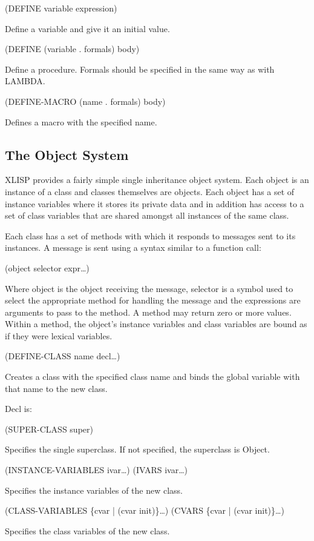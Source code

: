 \documentclass[11pt]{article}
\begin{document}
(DEFINE variable expression)

Define a variable and give it an initial value.

(DEFINE (variable . formals) body)

Define a procedure.  Formals should be specified in the same way as with
LAMBDA.

(DEFINE-MACRO (name . formals) body)

Defines a macro with the specified name.
\subsection{The Object System}
\label{sec-1-13}

XLISP provides a fairly simple single inheritance object system.  Each
object is an instance of a class and classes themselves are objects.
Each object has a set of instance variables where it stores its private
data and in addition has access to a set of class variables that are
shared amongst all instances of the same class.

Each class has a set of methods with which it responds to messages sent
to its instances.  A message is sent using a syntax similar to a
function call:

(object selector expr\ldots{})

Where object is the object receiving the message, selector is a symbol
used to select the appropriate method for handling the message and the
expressions are arguments to pass to the method.  A method may return
zero or more values.  Within a method, the object's instance variables
and class variables are bound as if they were lexical variables.


(DEFINE-CLASS name decl\ldots{})

Creates a class with the specified class name and binds the global
variable with that name to the new class.

Decl is:

(SUPER-CLASS super)

Specifies the single superclass.  If not specified, the superclass
is Object.

(INSTANCE-VARIABLES ivar\ldots{})
(IVARS ivar\ldots{})

Specifies the instance variables of the new class.

(CLASS-VARIABLES \{cvar | (cvar init)\}\ldots{})
(CVARS \{cvar | (cvar init)\}\ldots{})

Specifies the class variables of the new class.
\end{document}
